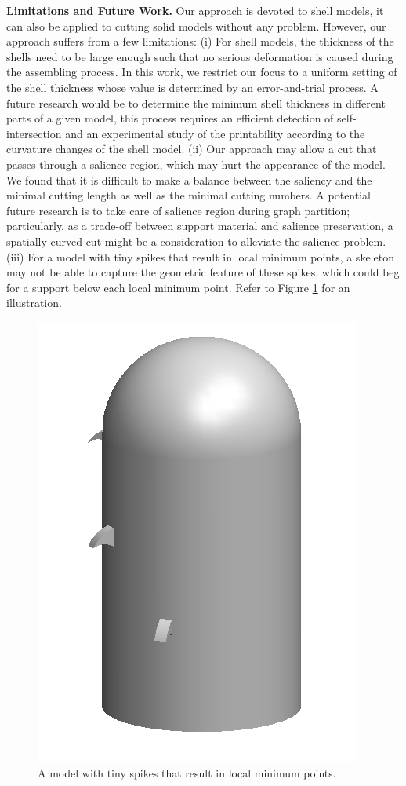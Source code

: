 \textbf{Limitations and Future Work.} Our approach is devoted to shell models, it can also be applied to cutting solid models without any problem. However, our approach suffers from a few limitations:
(i) For shell models, the thickness of the shells need to be large enough such that no serious deformation is caused during the assembling process. In this work, we restrict our focus to a uniform setting of the shell thickness whose value is determined by an error-and-trial process. A future research would be to determine the minimum shell thickness in different parts of a given model, this process requires an efficient detection of self-intersection and an experimental study of the printability according to the curvature changes of the shell model.
(ii) Our approach may allow a cut that passes through a salience region, which may hurt the appearance of the model. We found that it is difficult to make a balance between the saliency and the minimal cutting length as well as the minimal cutting numbers. A potential future research is to take care of salience region during graph partition; particularly, as a trade-off between support material and salience preservation, a spatially curved cut might be a consideration to alleviate the salience problem.
(iii)  {\color{red} {For a model with tiny spikes that result in local minimum points, a skeleton may not be able to capture the geometric feature of these spikes, which could beg for a support below each local minimum point. Refer to Figure \ref{fig:limit} for an illustration. }}

\begin{figure}[t!]
  \centering
  \includegraphics[width=0.2\linewidth]{figs/limit.png}
  \caption{\label{fig:limit}%
  A model with tiny spikes that result in local minimum points.}
\end{figure}


